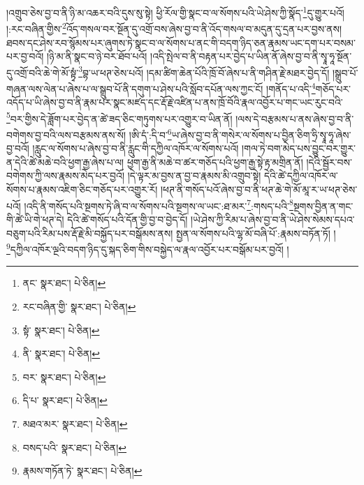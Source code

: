།འགྲུབ་ཅེས་བྱ་བ་ནི་ཉི་མ་འཆར་བའི་དུས་སུ་སྟེ། ཕྱི་རོལ་གྱི་སྣང་བ་ལ་སོགས་པའི་ཡེ་ཤེས་ཀྱི་སྣོད་\footnote{ནང་  སྣར་ཐང་།  པེ་ཅིན། }དུ་གྱུར་པའོ། །:རང་བཞིན་གྱིས་\footnote{རང་བཞིན་གྱི་  སྣར་ཐང་།  པེ་ཅིན། }འོད་གསལ་བར་སྔོན་དུ་འགྲོ་བས་ཞེས་བྱ་བ་ནི་འོད་གསལ་བ་མདུན་དུ་དྲན་པར་བྱས་ནས། ཐབས་དང་ཤེས་རབ་སྙོམས་པར་ཞུགས་ཏེ་སྣང་བ་ལ་སོགས་པ་ནང་གི་བདག་ཉིད་ཅན་རྣམས་ཡང་དག་པར་བསམ་པར་བྱ་བའོ། །ཉི་མ་ནི་སྣང་བ་ཉེ་བར་ཐོབ་པའོ། །འདི་སྤེལ་བ་ནི་བརྟན་པར་བྱེད་པ་ཡིན་ནོ་ཞེས་བྱ་བ་ནི་སྭཱ་ཧཱ་སྔོན་དུ་འགྲོ་བའི་ཆེ་གེ་མོ་སྟྭཾ་\footnote{སྟཾ་  སྣར་ཐང་།  པེ་ཅིན། }བྷ་ཡ་ཕཊ་ཅེས་པའོ། །དམ་ཚིག་ཆེན་པོའི་ཁྲོ་བོ་ཞེས་པ་ནི་གཤིན་རྗེ་མཐར་བྱེད་དོ། །སྒྲུབ་པོ་གཞན་ལས་ལེན་པ་ཞེས་པ་ལ་སྒྲུབ་པོ་ནི་དགུག་པ་ཤེས་པའི་སློབ་དཔོན་ལས་ཀྱང་ངོ། །གནོད་པ་འདི་\footnote{ནི་  སྣར་ཐང་།  པེ་ཅིན། }གཅོད་པར་འདོད་པ་ཡི་ཞེས་བྱ་བ་ནི་རྣམ་པར་སྣང་མཛད་དང་རྡོ་རྗེ་འཛིན་པ་ནས་ཁྲོ་བོའི་རྣལ་འབྱོར་པ་གང་ཡང་རུང་བའི་\footnote{བར་  སྣར་ཐང་།  པེ་ཅིན། }བར་གྱིས་དེ་ཟློག་པར་བྱེད་ན་ཚེ་ཟད་ཅིང་གཏུགས་པར་འགྱུར་བ་ཡིན་ནོ། །ལས་དེ་བརྩམས་པ་ནས་ཞེས་བྱ་བ་ནི་བགེགས་བྱ་བའི་ལས་བརྩམས་ནས་སོ། །ཨི་དཾ་:དི་བ་\footnote{དི་པ་  སྣར་ཐང་།  པེ་ཅིན། }ཡ་ཞེས་བྱ་བ་ནི་གསེར་ལ་སོགས་པ་བྱིན་ཅིག་ཧྲི་སྭཱ་ཧཱ་ཞེས་བྱ་བའོ། །རླུང་ལ་སོགས་པ་ཞེས་བྱ་བ་ནི་རླུང་གི་དཀྱིལ་འཁོར་ལ་སོགས་པའོ། །གལ་ཏེ་བག་མེད་པས་བྱུང་བར་གྱུར་ན་དེའི་ཚེ་མཆེ་བའི་ཕྱག་རྒྱ་ཞེས་པ་ལ། ཕྱག་རྒྱ་ནི་མཆེ་བ་ཚར་གཅོད་པའི་ཕྱག་རྒྱ་སྟེ་རྟ་མགྲིན་ནོ། །དེའི་སྦྱོར་བས་བགེགས་ཀྱི་ལས་རྣམས་མེད་པར་བྱའོ། །དེ་ལྟར་མ་བྱས་ན་བྱ་བ་རྣམས་མི་འགྲུབ་སྟེ། དེའི་ཚེ་དཀྱིལ་འཁོར་ལ་སོགས་པ་རྣམས་འཇིག་ཅིང་གཅོད་པར་འགྱུར་རོ། །ཕཊ་ནི་གསོད་པའོ་ཞེས་བྱ་བ་ནི་ཕཊ་ཆེ་གེ་མོ་མཱ་ར་ཡ་ཕཊ་ཅེས་པའོ། །འདི་ནི་གསོད་པའི་སྔགས་ཏེ་ཞི་བ་ལ་སོགས་པའི་སྔགས་ལ་ཡང་:ཐ་མར་\footnote{མཐའ་མར་  སྣར་ཐང་།  པེ་ཅིན། }:གསད་པའི་\footnote{བསད་པའི་  སྣར་ཐང་།  པེ་ཅིན། }སྔགས་བྱིན་ན་གང་གི་ཚེ་ཡི་གེ་ཕཊ་དེ། དེའི་ཚེ་གསོད་པའི་དོན་གྱི་བྱ་བ་བྱེད་དོ། །ཡེ་ཤེས་ཀྱི་རིམ་པ་ཞེས་བྱ་བ་ནི་ཡེ་ཤེས་སེམས་དཔའ་བཅུག་པའི་རིམ་པས་རྡོ་རྗེ་མི་བསྐྱོད་པར་བསྒོམས་ནས། སྤྱན་ལ་སོགས་པའི་ལྷ་མོ་བཞི་པོ་:རྣམས་བཏོན་ཏོ། །\footnote{རྣམས་གཏོན་ཏེ་  སྣར་ཐང་།  པེ་ཅིན། }དཀྱིལ་འཁོར་ལྔའི་བདག་ཉིད་དུ་སྐད་ཅིག་གིས་བསྐྱེད་ལ་རྣལ་འབྱོར་པར་བསྒོམ་པར་བྱའོ། །
